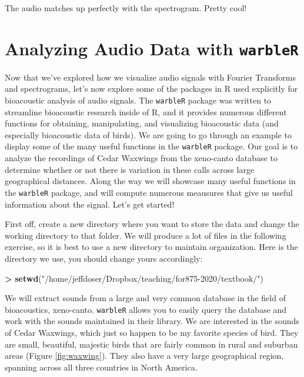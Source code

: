\documentclass[
]{krantz}
\makeatletter
\newenvironment{Shaded}{\begin{snugshade}}{\end{snugshade}}
\newcommand{\KeywordTok}[1]{\textcolor[rgb]{0.27,0.27,0.27}{\textbf{#1}}}
\newcommand{\NormalTok}[1]{#1}
\newcommand{\OperatorTok}[1]{\textcolor[rgb]{0.43,0.43,0.43}{\textbf{#1}}}
\newcommand{\StringTok}[1]{\textcolor[rgb]{0.5,0.5,0.5}{#1}}
\newenvironment{kframe}{%
\medskip{}
\setlength{\fboxsep}{.8em}
 \def\at@end@of@kframe{}%
 \ifinner\ifhmode%
  \def\at@end@of@kframe{\end{minipage}}%
  \begin{minipage}{\columnwidth}%
 \fi\fi%
 \def\FrameCommand##1{\hskip\@totalleftmargin \hskip-\fboxsep
 \colorbox{shadecolor}{##1}\hskip-\fboxsep
     \hskip-\linewidth \hskip-\@totalleftmargin \hskip\columnwidth}%
 \MakeFramed {\advance\hsize-\width
   \@totalleftmargin\z@ \linewidth\hsize
   \@setminipage}}%
 {\par\unskip\endMakeFramed%
 \at@end@of@kframe}
\renewenvironment{Shaded}{\begin{kframe}}{\end{kframe}}
\makeatother
\begin{document}
The audio matches up perfectly with the spectrogram. Pretty cool!

\hypertarget{analyzing-audio-data-with-warbler}{%
\section{\texorpdfstring{Analyzing Audio Data with \texttt{warbleR}}{Analyzing Audio Data with warbleR}}\label{analyzing-audio-data-with-warbler}}

Now that we've explored how we visualize audio signals with Fourier Transforms and spectrograms, let's now explore some of the packages in R used explicitly for bioacoustic analysis of audio signals. The \texttt{warbleR} package was written to streamline bioacoustic research inside of R, and it provides numerous different functions for obtaining, manipulating, and visualizing bioacoustic data (and especially bioacoustic data of birds). We are going to go through an example to display some of the many useful functions in the \texttt{warbleR} package. Our goal is to analyze the recordings of Cedar Waxwings from the xeno-canto database to determine whether or not there is variation in these calls across large geographical distances. Along the way we will showcase many useful functions in the \texttt{warbleR} package, and will compute numerous meausures that give us useful information about the signal. Let's get started!

First off, create a new directory where you want to store the data and change the working directory to that folder. We will produce a lot of files in the following exercise, so it is best to use a new directory to maintain organization. Here is the directory we use, you should change yours accordingly:

\begin{Shaded}
\begin{Highlighting}[]
\OperatorTok{\textgreater{}}\StringTok{ }\KeywordTok{setwd}\NormalTok{(}\StringTok{"/home/jeffdoser/Dropbox/teaching/for875{-}2020/textbook/"}\NormalTok{) }
\end{Highlighting}
\end{Shaded}

We will extract sounds from a large and very common database in the field of bioacoustics, xeno-canto. \texttt{warbleR} allows you to easily query the database and work with the sounds maintained in their library. We are interested in the sounds of Cedar Waxwings, which just so happen to be my favorite species of bird. They are small, beautiful, majestic birds that are fairly common in rural and suburban areas (Figure \ref{fig:waxwing}). They also have a very large geographical region, spanning across all three countries in North America.
\end{document}
